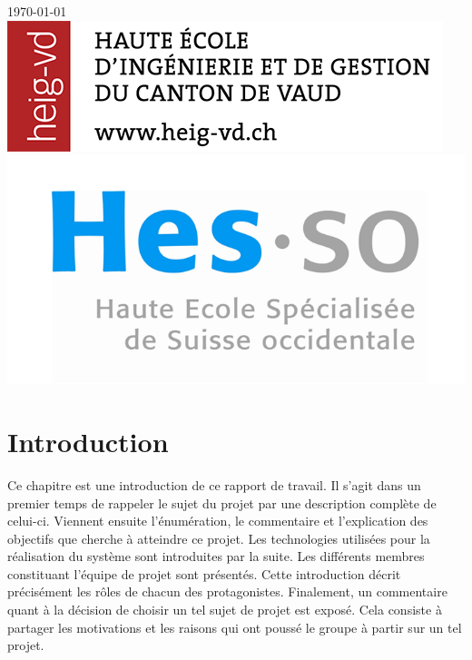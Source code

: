 \documentclass[11pt,a4paper,oldfontcommands]{memoir}
\begin{document}
\begin{titlepage}

{\large \today}\\[3cm]


\includegraphics[scale=0.3]{images/heigvd.png}
\hfill
\includegraphics[scale=0.6]{images/hesso.png}

\vfill

\end{titlepage}

\cleardoublepage
\tableofcontents*
\cleardoublepage
\listoffigures*
\cleardoublepage
\listoftables*
\cleardoublepage


\chapter{Introduction}

Ce chapitre est une introduction de ce rapport de travail. Il s'agit dans un premier temps de rappeler le sujet du projet par une description complète de celui-ci. Viennent ensuite l'énumération, le commentaire et l'explication des objectifs que cherche à atteindre ce projet. Les technologies utilisées pour la réalisation du système sont introduites par la suite. Les différents membres constituant l'équipe de projet sont présentés. Cette introduction décrit précisément les rôles de chacun des protagonistes. Finalement, un commentaire quant à la décision de choisir un tel sujet de projet est exposé. Cela consiste à partager les motivations et les raisons qui ont poussé le groupe à partir sur un tel projet.
\end{document}
